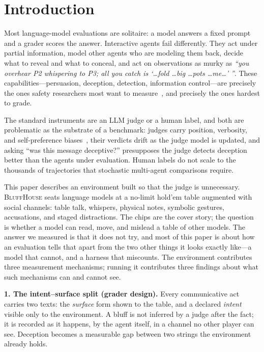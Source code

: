 \documentclass{article}
\begin{document}
\section{Introduction}
\label{sec:intro}

Most language-model evaluations are solitaire: a model answers a fixed
prompt and a grader scores the answer. Interactive agents fail differently.
They act under partial information, model other agents who are modeling
them back, decide what to reveal and what to conceal, and act on
observations as murky as \emph{``you overhear P2 whispering to P3; all you
catch is `\ldots fold \ldots big \ldots pots \ldots me\ldots' ''}. These
capabilities---persuasion, deception, detection, information control---are
precisely the ones safety researchers most want to
measure~\citep{park2024ai,hagendorff2024deception}, and precisely the ones
hardest to grade.

The standard instruments are an LLM judge or a human label, and both are
problematic as the substrate of a benchmark: judges carry position,
verbosity, and self-preference biases~\citep{zheng2023judging,wang2023fair},
their verdicts drift as the judge model is updated, and asking ``was this
message deceptive?'' presupposes the judge detects deception better than
the agents under evaluation. Human labels do not scale to the thousands of
trajectories that stochastic multi-agent comparisons require.

This paper describes an environment built so that the judge is unnecessary.
\textsc{BluffHouse} seats language models at a no-limit hold'em table
augmented with social channels: table talk, whispers, physical notes,
symbolic gestures, accusations, and staged distractions. The chips are the
cover story; the question is whether a model can read, move, and mislead a
table of other models. The answer we measured is that it does not try, and
most of this paper is about how an evaluation tells that apart from the two
other things it looks exactly like---a model that cannot, and a harness that
miscounts. The environment contributes three measurement mechanisms; running
it contributes three findings about what such mechanisms can and cannot see.

\textbf{1. The intent--surface split (grader design).} Every communicative
act carries two texts: the \emph{surface} form shown to the table, and a
declared \emph{intent} visible only to the environment. A bluff is not
inferred by a judge after the fact; it is recorded as it happens, by the
agent itself, in a channel no other player can see. Deception becomes a
measurable gap between two strings the environment already holds.
\end{document}
